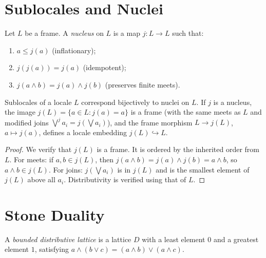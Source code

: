 \section{Sublocales and Nuclei}

\begin{definition}[Nucleus]
Let $L$ be a frame. A \emph{nucleus} on $L$ is a map $j\colon L \to L$ such that:
\begin{enumerate}
  \item $a \leq j(a)$ (inflationary);
  \item $j(j(a)) = j(a)$ (idempotent);
  \item $j(a \wedge b) = j(a) \wedge j(b)$ (preserves finite meets).
\end{enumerate}
\end{definition}

\begin{theorem}
Sublocales of a locale $L$ correspond bijectively to nuclei on $L$. If $j$ is a nucleus,
the image $j(L) = \{a \in L : j(a) = a\}$ is a frame (with the same meets as $L$ and
modified joins $\bigvee^j a_i = j(\bigvee a_i)$), and the frame morphism
$L \to j(L)$, $a \mapsto j(a)$, defines a locale embedding $j(L) \hookrightarrow L$.
\end{theorem}

\begin{proof}
We verify that $j(L)$ is a frame. It is ordered by the inherited order from $L$. For
meets: if $a, b \in j(L)$, then $j(a \wedge b) = j(a) \wedge j(b) = a \wedge b$, so
$a \wedge b \in j(L)$. For joins: $j(\bigvee a_i)$ is in $j(L)$ and is the smallest
element of $j(L)$ above all $a_i$. Distributivity is verified using that of $L$.
\end{proof}

\section{Stone Duality}

\begin{definition}
A \emph{bounded distributive lattice} is a lattice $D$ with a least element $0$ and a
greatest element $1$, satisfying $a \wedge (b \vee c) = (a \wedge b) \vee (a \wedge c)$.
\end{definition}

